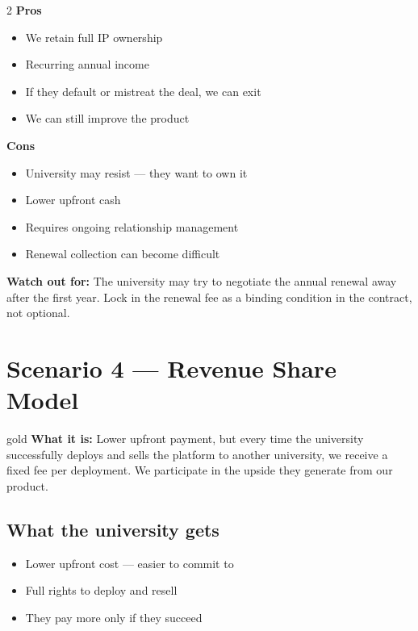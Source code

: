 \documentclass[12pt,a4paper]{article}
\begin{document}
    \begin{multicols}{2}
    \textbf{\color{green} Pros}
    \begin{itemize}[leftmargin=*, noitemsep]
        \item We retain full IP ownership
        \item Recurring annual income
        \item If they default or mistreat the deal, we can exit
        \item We can still improve the product
    \end{itemize}

    \columnbreak

    \textbf{\color{red} Cons}
    \begin{itemize}[leftmargin=*, noitemsep]
        \item University may resist — they want to own it
        \item Lower upfront cash
        \item Requires ongoing relationship management
        \item Renewal collection can become difficult
    \end{itemize}
    \end{multicols}

    \begin{warnbox}
    \textbf{Watch out for:} The university may try to negotiate the annual renewal away after the first year. Lock in the renewal fee as a binding condition in the contract, not optional.
    \end{warnbox}

    \newpage
    \section{Scenario 4 — Revenue Share Model}

    \begin{scenariobox}{gold}
    \textbf{What it is:} Lower upfront payment, but every time the university successfully deploys and sells the platform to another university, we receive a fixed fee per deployment. We participate in the upside they generate from our product.
    \end{scenariobox}

    \vspace{0.4cm}

    \subsection*{What the university gets}
    \begin{itemize}[leftmargin=*, noitemsep]
        \item Lower upfront cost — easier to commit to
        \item Full rights to deploy and resell
        \item They pay more only if they succeed
    \end{itemize}
\end{document}
